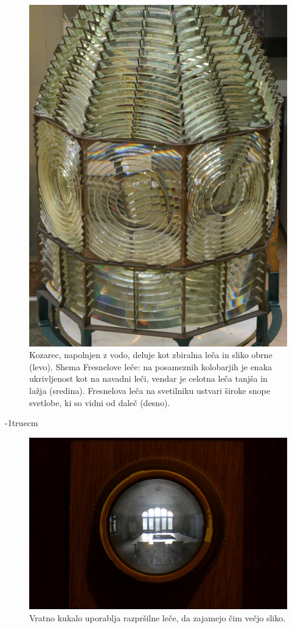 \begin{figure}[!htp]
\includegraphics[height=7truecm]{slike/02_photos_svetilnik.jpg}
\caption{Kozarec, napolnjen z vodo, deluje kot zbiralna leča in 
sliko obrne (levo). Shema Fresnelove leče: na posameznih
kolobarjih je enaka ukrivljenost kot na navadni leči, vendar je celotna 
leča tanjša in lažja (sredina). Fresnelova leča na svetilniku ustvari široke 
snope svetlobe, ki so vidni od daleč (desno).}
\label{fig:02_photos-2}
\end{figure}
\vglue-1truecm
\begin{figure}[!htp]
\centering
\includegraphics[width=8truecm]{slike/02_photos_peephole.jpg}
\caption{Vratno kukalo uporablja razpršilne leče, da zajamejo čim večjo sliko.}
\label{fig:02_photos-3}
\end{figure}

